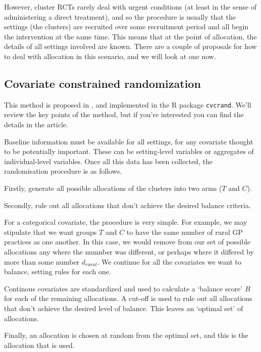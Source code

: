 \documentclass[
  openany]{book}
\theoremstyle{definition}
\theoremstyle{definition}
\theoremstyle{definition}
\theoremstyle{definition}
\theoremstyle{remark}
\begin{document}
However, cluster RCTs rarely deal with urgent conditions (at least in the sense of administering a direct treatment), and so the procedure is usually that the settings (the clusters) are recruited over some recruitment period and all begin the intervention at the same time. This means that at the point of allocation, the details of all settings involved are known.
There are a couple of proposals for how to deal with allocation in this scenario, and we will look at one now.

\hypertarget{covariate-constrained-randomization}{%
\subsection{Covariate constrained randomization}\label{covariate-constrained-randomization}}

This method is proposed in \citet{dickinson2015pragmatic}, and implemented in the R package \texttt{cvcrand}. We'll review the key points of the method, but if you're interested you can find the details in the article.

Baseline information must be available for all settings, for any covariate thought to be potentially important. These can be setting-level variables or aggregates of individual-level variables. Once all this data has been collected, the randomisation procedure is as follows.

Firstly, generate all possible allocations of the clusters into two arms (\(T\) and \(C\)).

Secondly, rule out all allocations that don't achieve the desired balance criteria.

For a categorical covariate, the procedure is very simple. For example, we may stipulate that we want groups \(T\) and \(C\) to have the same number of rural GP practices as one another. In this case, we would remove from our set of possible allocations any where the numnber was different, or perhaps where it differed by more than some number \(d_{rural}\). We continue for all the covariates we want to balance, setting rules for each one.

Continous covariates are standardized and used to calculate a `balance score' \(B\) for each of the remaining allocations. A cut-off is used to rule out all allocations that don't achieve the desired level of balance. This leaves an `optimal set' of allocations.

Finally, an allocation is chosen at random from the optimal set, and this is the allocation that is used.
\end{document}
